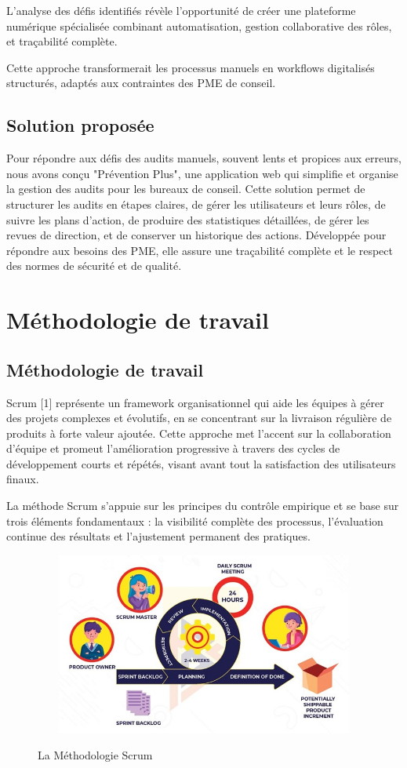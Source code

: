 \noindent L'analyse des défis identifiés révèle l'opportunité de créer une plateforme numérique spécialisée combinant automatisation, gestion collaborative des rôles, et traçabilité complète.

Cette approche transformerait les processus manuels en workflows digitalisés structurés, adaptés aux contraintes des PME de conseil.

\subsection{Solution proposée}

\noindent Pour répondre aux défis des audits manuels, souvent lents et propices aux erreurs, nous avons conçu "Prévention Plus", une application web qui simplifie et organise la gestion des audits pour les bureaux de conseil. Cette solution permet de structurer les audits en étapes claires, de gérer les utilisateurs et leurs rôles, de suivre les plans d'action, de produire des statistiques détaillées, de gérer les revues de direction, et de conserver un historique des actions. Développée pour répondre aux besoins des PME, elle assure une traçabilité complète et le respect des normes de sécurité et de qualité.

\section{Méthodologie de travail}

\subsection{Méthodologie de travail}

\noindent Scrum [1] représente un framework organisationnel qui aide les équipes à gérer des projets complexes et évolutifs, en se concentrant sur la livraison régulière de produits à forte valeur ajoutée. Cette approche met l'accent sur la collaboration d'équipe et promeut l'amélioration progressive à travers des cycles de développement courts et répétés, visant avant tout la satisfaction des utilisateurs finaux.

La méthode Scrum s'appuie sur les principes du contrôle empirique et se base sur trois éléments fondamentaux : la visibilité complète des processus, l'évaluation continue des résultats et l'ajustement permanent des pratiques.

\begin{figure}[H]%
    \center%
{
    \includegraphics[width=12cm,height=6cm]{images/scrum method.jpg}%
    }
    \caption{La Méthodologie Scrum}%
\end{figure}

